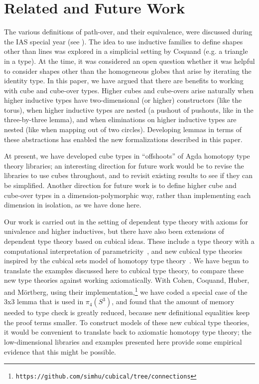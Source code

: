 \section{Related and Future Work}

The various definitions of path-over, and their equivalence, were
discussed during the IAS special year (see \citep[Remark
  6.3.2]{uf13hott-book}).  The idea to use inductive families to define
shapes other than lines was explored in a simplicial setting by Coquand
(e.g. a triangle in a type).  At the time, it was considered an open
question whether it was helpful to consider shapes other than the
homogeneous globes that arise by iterating the identity type.  In this
paper, we have argued that there are benefits to working with cube and
cube-over types.  Higher cubes and cube-overs arise naturally when
higher inductive types have two-dimensional (or higher) constructors
(like the torus), when higher inductive types are nested (a pushout of
pushouts, like in the three-by-three lemma), and when eliminations on
higher inductive types are nested (like when mapping out of two
circles).  Developing lemmas in terms of these abstractions has enabled
the new formalizations described in this paper.

At present, we have developed cube types in ``offshoots'' of Agda
homotopy type theory libraries; an interesting direction for future work
would be to revise the libraries to use cubes throughout, and to revisit
existing results to see if they can be simplified.  Another direction
for future work is to define higher cube and cube-over types in a
dimension-polymorphic way, rather than implementing each dimension in
isolation, as we have done here.

Our work is carried out in the setting of dependent type theory with
axioms for univalence and higher inductives, but there have also been
extensions of dependent type theory based on cubical ideas.  These
include a type theory with a computational interpretation of
parametricity~\citep{bernardy12parametricity}, and new cubical type
theories~\citep{coquand14variations,altenkirchkaposi14cubical,lb14cubes-oxford,polonsky14internalization}
inspired by the cubical sets model of homotopy type
theory~\citep{coquand+13cubical}.  We have begun to translate the
examples discussed here to cubical type theory, to compare these new
type theories against working axiomatically.  With Cohen, Coquand,
Huber, and M\"ortberg, using their
implementation,\footnote{\texttt{https://github.com/simhu/cubical/tree/connections}}
we have coded a special case of the 3x3 lemma that is used in
$\pi_4(S^3)$, and found that the amount of memory needed to type check
is greatly reduced, because new definitional equalities keep the proof
terms smaller.  To construct models of these new cubical type theories,
it would be convenient to translate back to axiomatic homotopy type
theory; the low-dimensional libraries and examples presented here
provide some empirical evidence that this might be possible.
